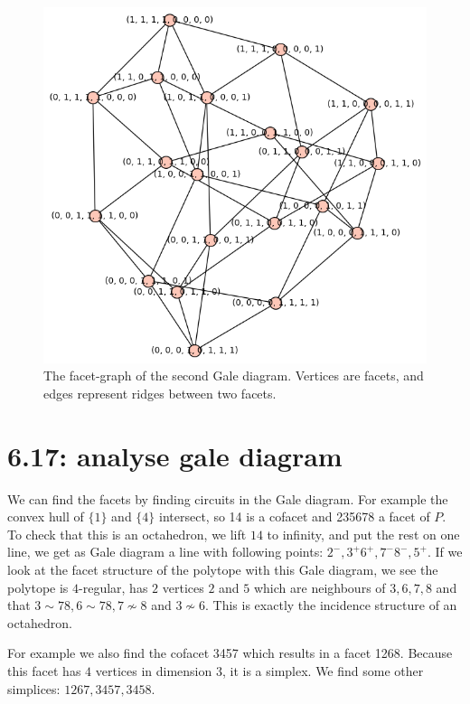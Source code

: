\documentclass[paper=a4, fontsize=11pt]{scrartcl} %
\theoremstyle{plain}
\begin{document}
\begin{figure}[htbp] %
   \centering
   \includegraphics[width=\textwidth]{secondGale} 
   \caption{The facet-graph of the second Gale diagram. Vertices are facets, and edges represent ridges between two facets.}
   \label{fig:2}
\end{figure}



 
\section{6.17: analyse gale diagram}
We can find the facets by finding circuits in the Gale diagram. For example the convex hull of $\{1\}$ and $\{4\}$ intersect, so 14 is a cofacet and 235678 a facet of $P$. To check that this is an octahedron, we lift $14$ to infinity, and put the rest on one line, we get as Gale diagram a line with following points: $2^-,3^+6^+,7^-8^-,5^+$. If we look at the facet structure of the polytope with this Gale diagram, we see the polytope is $4$-regular, has $2$ vertices $2$ and $5$ which are neighbours of $3,6,7,8$ and that $3\sim 78,6\sim 78, 7\not\sim 8$ and $3\not\sim 6$. This is exactly the incidence structure of an octahedron.

For example we also find the cofacet 3457 which results in a facet 1268. Because this facet has $4$ vertices in dimension $3$, it is a simplex. We find some other simplices: $1267,3457,3458$.
\end{document}
